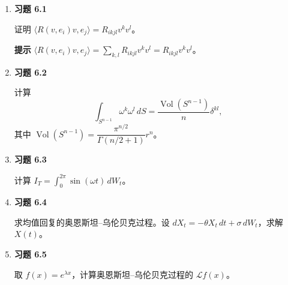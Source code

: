 
\begin{enumerate}
  \item \textbf{习题 6.1}\par
  证明 $\langle R(v,e_i)v,e_j\rangle=R_{ikjl}v^kv^l$。

  \textbf{提示}\quad
  $\displaystyle\langle R(v,e_i)v,e_j\rangle
    =\sum_{k,l}R_{ikjl}v^kv^l=R_{ikjl}v^kv^l$。
  \item \textbf{习题 6.2}\par
  计算
  \[
    \int_{S^{n-1}}\omega^k\omega^l\,dS
     =\frac{\operatorname{Vol}(S^{n-1})}{n}\delta^{kl},
  \]
  其中 $\operatorname{Vol}(S^{n-1})=\dfrac{\pi^{n/2}}{\Gamma(n/2+1)}r^n$。
  \item \textbf{习题 6.3}\par
  计算 $\displaystyle I_T=\int_0^{2\pi}\sin(\omega t)\,dW_t$。
  \item \textbf{习题 6.4}\par
  求均值回复的奥恩斯坦–乌伦贝克过程。设 $dX_t=-\theta X_t\,dt+\sigma\,dW_t$，求解 $X(t)$。
  \item \textbf{习题 6.5}\par
  取 $f(x)=e^{\lambda x}$，计算奥恩斯坦–乌伦贝克过程的 $\mathcal Lf(x)$。
\end{enumerate}

